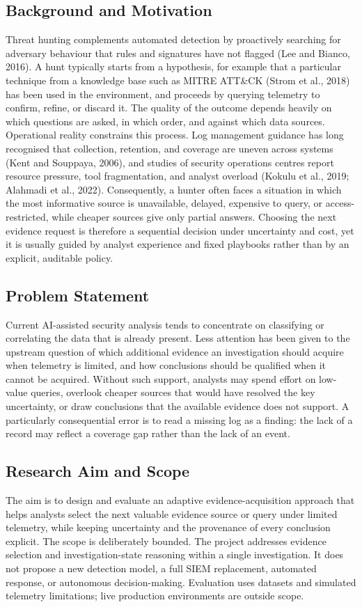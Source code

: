 \documentclass[a4paper,11pt,oneside]{article}
\begin{document}
\subsection{Background and Motivation}
Threat hunting complements automated detection by proactively searching for adversary behaviour that rules and signatures have not flagged (Lee and Bianco, 2016). A hunt typically starts from a hypothesis, for example that a particular technique from a knowledge base such as MITRE ATT\&CK (Strom et al., 2018) has been used in the environment, and proceeds by querying telemetry to confirm, refine, or discard it. The quality of the outcome depends heavily on which questions are asked, in which order, and against which data sources. Operational reality constrains this process. Log management guidance has long recognised that collection, retention, and coverage are uneven across systems (Kent and Souppaya, 2006), and studies of security operations centres report resource pressure, tool fragmentation, and analyst overload (Kokulu et al., 2019; Alahmadi et al., 2022). Consequently, a hunter often faces a situation in which the most informative source is unavailable, delayed, expensive to query, or access-restricted, while cheaper sources give only partial answers. Choosing the next evidence request is therefore a sequential decision under uncertainty and cost, yet it is usually guided by analyst experience and fixed playbooks rather than by an explicit, auditable policy.
\subsection{Problem Statement}
Current AI-assisted security analysis tends to concentrate on classifying or correlating the data that is already present. Less attention has been given to the upstream question of which additional evidence an investigation should acquire when telemetry is limited, and how conclusions should be qualified when it cannot be acquired. Without such support, analysts may spend effort on low-value queries, overlook cheaper sources that would have resolved the key uncertainty, or draw conclusions that the available evidence does not support. A particularly consequential error is to read a missing log as a finding: the lack of a record may reflect a coverage gap rather than the lack of an event.
\subsection{Research Aim and Scope}
The aim is to design and evaluate an adaptive evidence-acquisition approach that helps analysts select the next valuable evidence source or query under limited telemetry, while keeping uncertainty and the provenance of every conclusion explicit. The scope is deliberately bounded. The project addresses evidence selection and investigation-state reasoning within a single investigation. It does not propose a new detection model, a full SIEM replacement, automated response, or autonomous decision-making. Evaluation uses datasets and simulated telemetry limitations; live production environments are outside scope.
\end{document}
